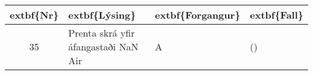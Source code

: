 \documentclass[a4paper]{article}
\begin{document}
\begin{tabular}{|c|p{10cm}|l|l|}
\hline
	extbf\{Nr\}&	extbf\{Lýsing\}&	extbf\{Forgangur\}&	extbf\{Fall\}\\
\hline
35&Prenta skrá yfir áfangastaði NaN Air&A &()\\
\hline
\end{tabular}
\end{document}

